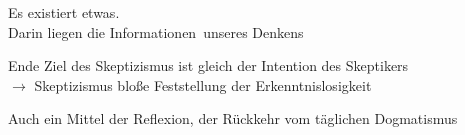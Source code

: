 \documentclass[12pt]{beamer}
\begin{document}
\begin{frame}
\begin{center}
Es existiert \glqq etwas\grqq .\\
Darin liegen die \glqq Informationen\grqq\ unseres \glqq Denkens\grqq
\end{center}
\end{frame}

\begin{frame}{Ende}
Ziel des Skeptizismus ist gleich der Intention des Skeptikers\\
$\rightarrow$ Skeptizismus bloße Feststellung der Erkenntnislosigkeit\\
\begin{center}
Auch ein Mittel der Reflexion, der Rückkehr vom täglichen Dogmatismus
\end{center}
\end{frame}
%
%
%
\end{document}
